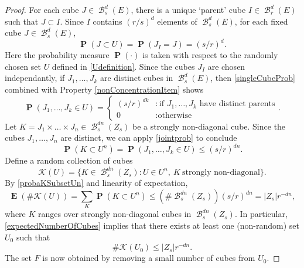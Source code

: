 \documentclass[dvipsnames,letterpaper,12pt]{article}
\numberwithin{equation}{section}
\theoremstyle{plain}
\DeclareMathOperator{\Prob}{\mathbf{P}}
\DeclareMathOperator{\Expect}{\mathbf{E}}
\DeclareMathOperator{\B}{\mathcal{B}}
\begin{document}
\begin{proof}
	For each cube $J \in \B_s^d(E)$, there is a unique `parent' cube $I \in \B_r^d(E)$ such that $J \subset I$. Since $I$ contains $(r/s)^d$ elements of $\B^d_s(E)$, for each fixed cube $J \in \B^d_s(E)$,
	\begin{equation} \label{singleCubeProb}
		\Prob(J \subset U) = \Prob(J_I = J) = (s/r)^d.
	\end{equation}
	Here the probability measure $\Prob(\cdot)$ is taken with respect to the randomly chosen set $U$ defined in \eqref{Udefinition}. Since the cubes $J_I$ are chosen independantly, if $J_1, \dots, J_k$ are distinct cubes in $\B^d_s(E)$, then \eqref{singleCubeProb} combined with Property \ref{nonConcentrationItem} shows
	\begin{equation}\label{jointprob}
		\Prob(J_1, \dots, J_k \in U) = \begin{cases} (s/r)^{dk} &: \text{if $J_1, \dots, J_k$ have distinct parents} \\ 0 &: \text{otherwise} \end{cases}.
	\end{equation}
	Let $K = J_1 \times \dots \times J_n \in \B^{dn}_s(Z_s)$ be a strongly non-diagonal cube. Since the cubes $J_1, \dots, J_n$ are distinct, we can apply \eqref{jointprob} to conclude
	\begin{equation}\label{probaKSubsetUn}
		\Prob(K \subset U^n) = \Prob(J_1, \dots, J_k \in U) \leq (s/r)^{dn}.
	\end{equation}
	Define a random collection of cubes
	\begin{equation}\label{KUDef}
		\mathcal{K}(U)=\{ K \in \B_s^{dn}(Z_s) \colon U\in U^n,\ K\ \textrm{strongly non-diagonal}  \}.
	\end{equation}
	By \eqref{probaKSubsetUn} and linearity of expectation,
	\begin{equation}\label{expectedNumberOfCubes}
		\Expect(\# \mathcal{K}(U)) = \sum_K \Prob(K \subset U^n) \leq (\# \B_s^{dn}(Z_s)) (s/r)^{dn} = |Z_s| r^{-dn},
	\end{equation}
	where $K$ ranges over strongly non-diagonal cubes in $\B^{dn}_s(Z_s)$. In particular, \eqref{expectedNumberOfCubes} implies that there exists at least one (non-random) set $U_0$ such that
	\begin{equation}\label{KU0Small}
		\# \mathcal{K}(U_0) \leq  |Z_s| r^{-dn}.
	\end{equation}
	The set $F$ is now obtained by removing a small number of cubes from $U_0$.


\end{proof}
\end{document}
